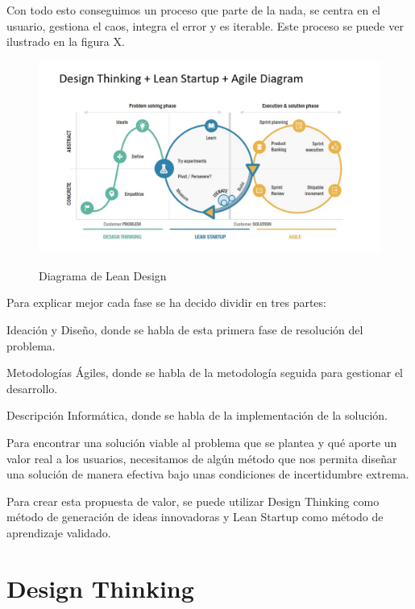 \documentclass[12pt,twoside,titlepage]{report}
\begin{document}
Con todo esto conseguimos un proceso que parte de la nada, se centra en el usuario, gestiona el caos, integra el error y es iterable. Este proceso se puede ver ilustrado en la figura X.

\begin{figure}[H] 
    \includegraphics[scale=0.3]{LeanDesignAgile}
    \centering
    \label{fig:Lean Design Agile}
    \caption{Diagrama de Lean Design}
\end{figure}

Para explicar mejor cada fase se ha decido dividir en tres partes: 

\begin{compactitem}
    \item Ideación y Diseño, donde se habla de esta primera fase de resolución del problema.
    \item Metodologías Ágiles, donde se habla de la metodología seguida para gestionar el desarrollo.
    \item Descripción Informática, donde se habla de la implementación de la solución.
\end{compactitem}

Para encontrar una solución viable al problema que se plantea y qué aporte un valor real a los usuarios, necesitamos de algún método que nos permita diseñar una solución de manera efectiva bajo unas condiciones de incertidumbre extrema.

Para crear esta propuesta de valor, se puede utilizar Design Thinking como método de generación de ideas innovadoras y Lean Startup como método de aprendizaje validado.

\section{Design Thinking}
\end{document}
